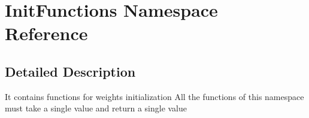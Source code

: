 \hypertarget{namespace_init_functions}{\section{Init\-Functions Namespace Reference}
\label{namespace_init_functions}
}


\subsection{Detailed Description}
It contains functions for weights initialization All the functions of this namespace must take a single value and return a single value 